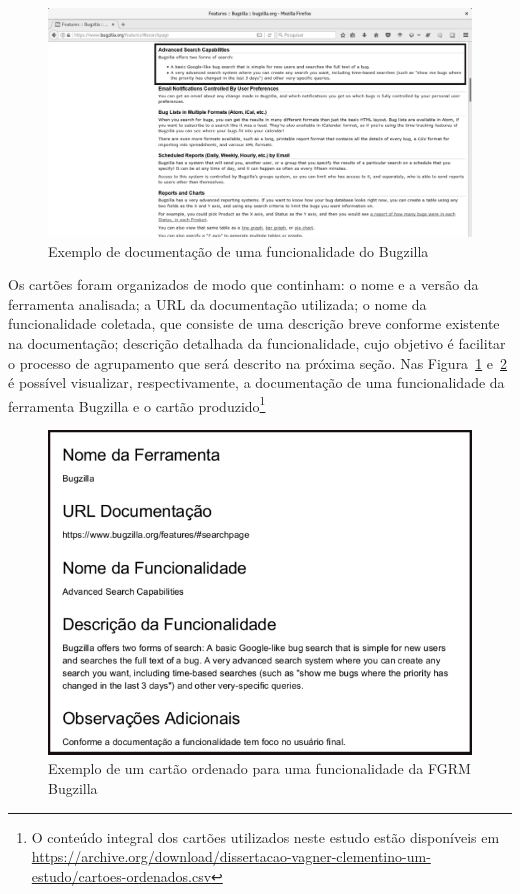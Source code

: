 \begin{figure}[htpb]
	\centering
	\includegraphics[width=1.0\linewidth]{./chapter-estudo-funcionalidades-fgrm/img/documentacao_bugzilla.png}
	\caption{Exemplo de documentação de uma funcionalidade do Bugzilla}\label{fig:documentacao_bugzilla}
\end{figure}

Os cartões foram organizados de modo que continham: o nome e a versão da
ferramenta analisada; a URL da documentação utilizada; o nome da funcionalidade
coletada, que consiste de uma descrição breve conforme existente na
documentação; descrição detalhada da funcionalidade, cujo objetivo é facilitar
o processo de agrupamento que será descrito na próxima seção. Nas
Figura~\ref{fig:documentacao_bugzilla} e~\ref{fig:exemplo_cartao_ordenado} é
possível visualizar, respectivamente, a documentação de uma funcionalidade da
ferramenta Bugzilla e o cartão produzido\footnote{O conteúdo integral dos
    cartões utilizados neste estudo estão disponíveis em
    \url{https://archive.org/download/dissertacao-vagner-clementino-um-estudo/cartoes-ordenados.csv}}

\begin{figure}[htpb]
	\centering
	\includegraphics[width=0.9\linewidth]{./chapter-estudo-funcionalidades-fgrm/img/exemplo_cartao_ordenado.png}
	\caption{Exemplo de um cartão ordenado para uma funcionalidade da FGRM
		Bugzilla}\label{fig:exemplo_cartao_ordenado}
\end{figure}

